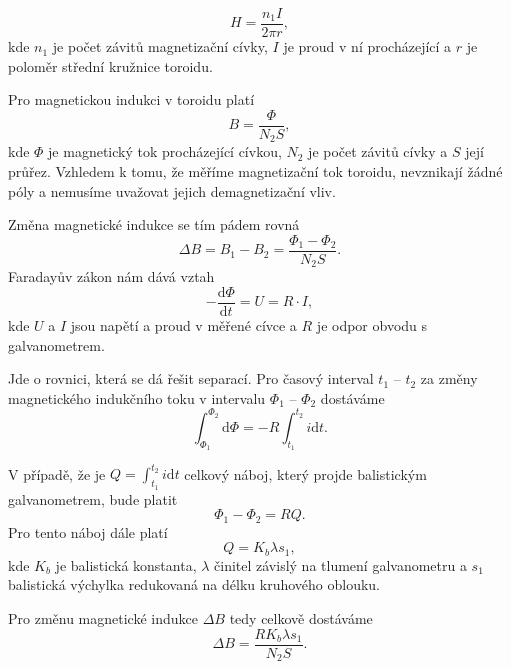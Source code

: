 \documentclass[english]{article}
\newcommand{\dd}{\mathrm{d}}
\begin{document}
		\begin{equation} \label{eq:Hfinal}
		H = \frac{n_1 I}{2 \pi r},
		\end{equation}
		kde $n_1$ je počet závitů magnetizační cívky, $I$ je proud v ní procházející a $r$ je poloměr střední kružnice toroidu.
		
		
		Pro magnetickou indukci v toroidu platí
		\begin{equation}
		B = \frac{\Phi}{N_2 S},
		\end{equation}
		kde $\Phi$ je magnetický tok procházející cívkou, $N_2$ je počet závitů cívky a $S$ její průřez. Vzhledem k tomu, že měříme magnetizační tok toroidu, nevznikají žádné póly a nemusíme uvažovat jejich demagnetizační vliv.
		
		Změna magnetické indukce se tím pádem rovná
		\begin{equation}
		\Delta B = B_1 - B_2 = \frac{\Phi_1 - \Phi_2}{N_2 S}.
		\end{equation}
		Faradayův zákon nám dává vztah
		\begin{equation}
		-\frac{\dd \Phi}{\dd t} = U = R\cdot I,
		\end{equation}
		kde $U$ a $I$ jsou napětí a proud v měřené cívce a $R$ je odpor obvodu s galvanometrem.
		
		Jde o rovnici, která se dá řešit separací. Pro časový interval $t_1$ -- $t_2$ za změny magnetického indukčního toku v intervalu $\Phi_1$ -- $\Phi_2$ dostáváme
		\begin{equation}
		\int_{\Phi_1}^{\Phi_2} \dd \Phi = -R \int_{t_1}^{t_2} i \dd t.
		\end{equation}
		
		
		V případě, že je $Q = \int_{t_1}^{t_2}i\dd t$ celkový náboj, který projde balistickým galvanometrem, bude platit
		\begin{equation}
		\Phi_1 - \Phi_2 = R Q.
		\end{equation}
		Pro tento náboj dále platí
		\begin{equation}
		Q = K_b \lambda s_1,
		\end{equation}
		kde $K_b$ je balistická konstanta, $\lambda$ činitel závislý na tlumení galvanometru a $s_1$ balistická výchylka redukovaná na délku kruhového oblouku.
		
		Pro změnu magnetické indukce $\Delta B$ tedy celkově dostáváme
		\begin{equation} \label{eq:deltaBfial}
		\Delta B = \frac{R K_b\lambda s_1}{N_2 S}.
		\end{equation}
		
\end{document}
